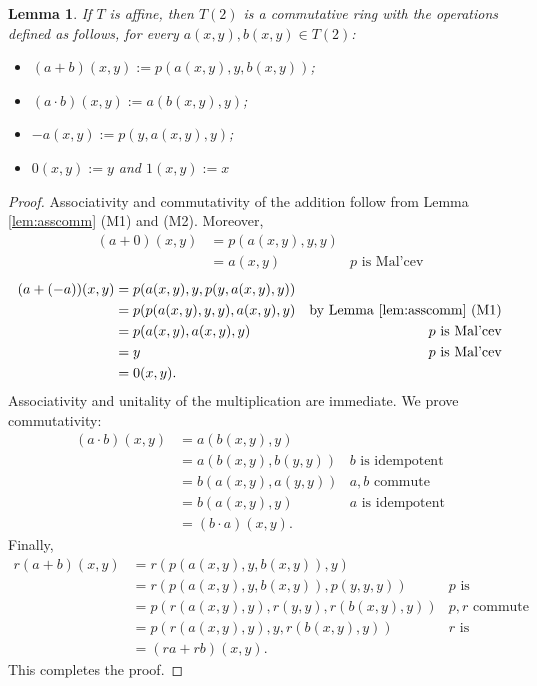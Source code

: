 \documentclass{amsart}
\numberwithin{equation}{section}
\theoremstyle{plain}
\newtheorem{lemma}[theorem]{Lemma}
\theoremstyle{definition}
\begin{document}
\begin{lemma}
  \label{lem:ring}
    If $T$ is affine, then $T(2)$ is a commutative ring with the operations defined as follows, for every $a(x,y), b(x,y) \in T(2)$: 
  \begin{itemize}
    \item $(a + b)(x,y) := p(a(x,y),y,b(x,y))$; 
    \item $(a \cdot b)(x,y) := a(b(x,y),y)$; 
    \item $-a(x,y):=p(y,a(x,y),y)$; 
    \item $0(x,y):=y$ and $1(x,y):=x$ 
  \end{itemize} 
\end{lemma}
\begin{proof}
    Associativity and commutativity of the addition follow from Lemma \ref{lem:asscomm} (M1) and (M2). 
    Moreover, 
    \begin{align*}
      (a + 0)(x,y) & = p(a(x,y), y, y) & \\
      & = a(x,y) & p \text{ is Mal'cev} 
    \end{align*}
    \begin{align*}
      (a + (-a))(x,y) & = p(a(x,y),y,p(y,a(x,y),y)) & \\
      & = p(p(a(x,y),y,y),a(x,y),y) & \text{by Lemma \ref{lem:asscomm} (M1)}  \\
      & = p(a(x,y), a(x,y), y) & p \text{ is Mal'cev} \\ 
      & = y & p \text{ is Mal'cev} \\
      & = 0(x,y) \text{.} 
    \end{align*}
    Associativity and unitality of the multiplication are immediate. 
    We prove commutativity: 
    \begin{align*}
      (a \cdot b)(x,y) & = a(b(x,y), y) & \\
      & = a(b(x,y), b(y,y)) & b \text{ is idempotent}  \\ 
      & = b(a(x,y), a(y,y)) & a,b \text{ commute} \\
      & = b(a(x,y), y) & a \text{ is idempotent} \\
      & = (b\cdot a)(x,y)  \text{.} 
    \end{align*}
    Finally, 
    \begin{align*}
      r(a+b)(x,y) & = r(p(a(x,y),y,b(x,y)),y) & \\
      & = r(p(a(x,y),y,b(x,y)),p(y,y,y)) & p \text{ is idempotent}  \\ 
      & = p(r(a(x,y),y), r(y,y), r(b(x,y),y)) & p,r \text{ commute}  \\ 
      & = p(r(a(x,y),y), y, r(b(x,y),y)) & r \text{ is idempotent} \\
      & = (ra +rb)(x,y) \text{.} 
    \end{align*}
    This completes the proof. 
  \end{proof}
\end{document}
